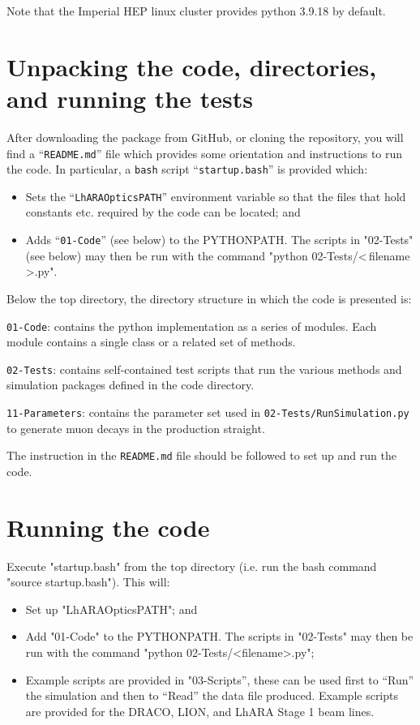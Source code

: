 Note that the Imperial HEP linux cluster provides python 3.9.18 by
default.

\section*{Unpacking the code, directories, and running the tests}
After downloading the package from GitHub, or cloning the repository,
you will find a ``\verb+README.md+'' file which provides some orientation
and instructions to run the code.
In particular, a \verb+bash+ script ``\verb+startup.bash+'' is
provided which:
\begin{itemize}
  \item Sets the ``\verb+LhARAOpticsPATH+'' environment variable
    so that the files that hold constants etc. required by the code
    can be located; and
  \item Adds ``\verb+01-Code+'' (see below) to the PYTHONPATH.
    The scripts in "02-Tests" (see below) may then be run with the
    command "python 02-Tests/\textless\,filename\,\textgreater.py".
\end{itemize}
Below the top directory, the directory structure in which the code is
presented is:
\begin{description}
  \item\verb+01-Code+: contains the python implementation as a
    series of modules.
    Each module contains a single class or a related set of methods.
  \item\verb+02-Tests+: contains self-contained test scripts that
    run the various methods and simulation packages defined in the
    code directory.
  \item\verb+11-Parameters+: contains the parameter set used in
    \verb+02-Tests/RunSimulation.py+ to generate muon decays in
    the production straight.
\end{description}
The instruction in the \verb+README.md+ file should be followed to set
up and run the code.

\section*{Running the code}
Execute "startup.bash" from the top directory (i.e. run the bash
command "source startup.bash").  This will:
\begin{itemize}
  \item Set up "LhARAOpticsPATH"; and
  \item Add "01-Code" to the PYTHONPATH.  The scripts in "02-Tests"
    may then be run with the command "python 02-Tests/<filename>.py";
  \item Example scripts are provided in "03-Scripts'', these can be
    used first to ``Run'' the simulation and then to ``Read'' the data
    file produced.
    Example scripts are provided for the DRACO, LION, and LhARA Stage
    1 beam lines.
\end{itemize}
